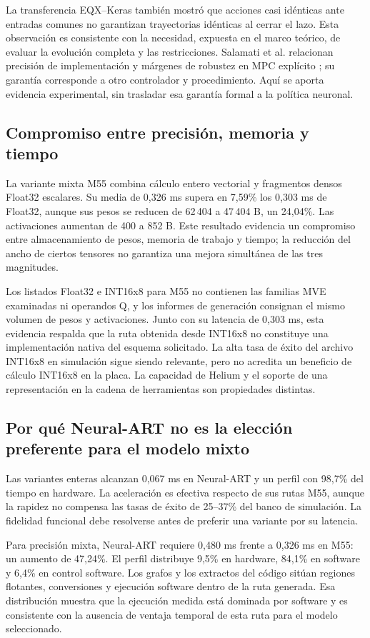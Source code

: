 La transferencia EQX--Keras también mostró que acciones casi idénticas ante entradas comunes no garantizan trayectorias idénticas al cerrar el lazo. Esta observación es consistente con la necesidad, expuesta en el marco teórico, de evaluar la evolución completa y las restricciones. Salamati et al. relacionan precisión de implementación y márgenes de robustez en MPC explícito \cite{salamati2019}; su garantía corresponde a otro controlador y procedimiento. Aquí se aporta evidencia experimental, sin trasladar esa garantía formal a la política neuronal.

\subsection{Compromiso entre precisión, memoria y tiempo}
La variante mixta M55 combina cálculo entero vectorial y fragmentos densos Float32 escalares. Su media de 0,326 ms supera en 7,59\% los 0,303 ms de Float32, aunque sus pesos se reducen de 62\,404 a 47\,404 B, un 24,04\%. Las activaciones aumentan de 400 a 852 B. Este resultado evidencia un compromiso entre almacenamiento de pesos, memoria de trabajo y tiempo; la reducción del ancho de ciertos tensores no garantiza una mejora simultánea de las tres magnitudes.

Los listados Float32 e INT16x8 para M55 no contienen las familias MVE examinadas ni operandos Q, y los informes de generación consignan el mismo volumen de pesos y activaciones. Junto con su latencia de 0,303 ms, esta evidencia respalda que la ruta obtenida desde INT16x8 no constituye una implementación nativa del esquema solicitado. La alta tasa de éxito del archivo INT16x8 en simulación sigue siendo relevante, pero no acredita un beneficio de cálculo INT16x8 en la placa. La capacidad de Helium y el soporte de una representación en la cadena de herramientas son propiedades distintas.

\subsection{Por qué Neural-ART no es la elección preferente para el modelo mixto}
Las variantes enteras alcanzan 0,067 ms en Neural-ART y un perfil con 98,7\% del tiempo en hardware. La aceleración es efectiva respecto de sus rutas M55, aunque la rapidez no compensa las tasas de éxito de 25--37\% del banco de simulación. La fidelidad funcional debe resolverse antes de preferir una variante por su latencia.

Para precisión mixta, Neural-ART requiere 0,480 ms frente a 0,326 ms en M55: un aumento de 47,24\%. El perfil distribuye 9,5\% en hardware, 84,1\% en software y 6,4\% en control software. Los grafos y los extractos del código sitúan regiones flotantes, conversiones y ejecución software dentro de la ruta generada. Esa distribución muestra que la ejecución medida está dominada por software y es consistente con la ausencia de ventaja temporal de esta ruta para el modelo seleccionado.

